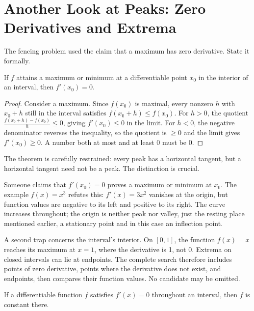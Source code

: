 \section{Another Look at Peaks: Zero Derivatives and Extrema}

The fencing problem used the claim that a maximum has zero derivative. State it formally.

\begin{dingli}
If $f$ attains a maximum or minimum at a differentiable point $x_0$ in the interior of an interval, then $f'(x_0)=0$.
\end{dingli}

\begin{proof}
Consider a maximum. Since $f(x_0)$ is maximal, every nonzero $h$ with $x_0+h$ still in the interval satisfies $f(x_0+h)\le f(x_0)$. For $h>0$, the quotient $\frac{f(x_0+h)-f(x_0)}{h}\le 0$, giving $f'(x_0)\le 0$ in the limit. For $h<0$, the negative denominator reverses the inequality, so the quotient is $\ge 0$ and the limit gives $f'(x_0)\ge 0$. A number both at most and at least 0 must be 0.
\end{proof}

The theorem is carefully restrained: every peak has a horizontal tangent, but a horizontal tangent need not be a peak. The distinction is crucial.

\begin{fanli}
Someone claims that $f'(x_0)=0$ proves a maximum or minimum at $x_0$. The example $f(x)=x^3$ refutes this: $f'(x)=3x^2$ vanishes at the origin, but function values are negative to its left and positive to its right. The curve increases throughout; the origin is neither peak nor valley, just the resting place mentioned earlier, a stationary point and in this case an inflection point.

A second trap concerns the interval's interior. On $[0,1]$, the function $f(x)=x$ reaches its maximum at $x=1$, where the derivative is 1, not 0. Extrema on closed intervals can lie at endpoints. The complete search therefore includes points of zero derivative, points where the derivative does not exist, and endpoints, then compares their function values. No candidate may be omitted.
\end{fanli}

\begin{tuilun}
If a differentiable function $f$ satisfies $f'(x)=0$ throughout an interval, then $f$ is constant there.
\end{tuilun}


